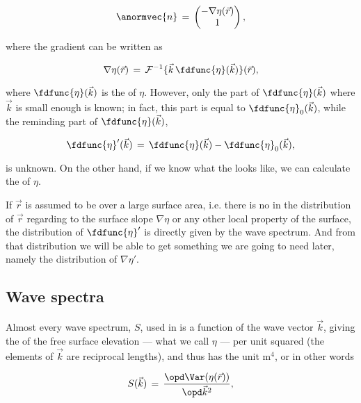 {\begin{equation}
\anormvec{n} \,=\, \left(\!\!\!\begin{array}{c}-\nabla\eta(\vec{r}) \\ 1\end{array}\!\!\!\right),
\end{equation}

where the gradient can be written as

\begin{equation}
\nabla\eta(\vec{r}) \,=\, \mathcal{F}^{-1}\{\vec{k}\,\fdfunc{\eta}(\vec{k})\}(\vec{r}),
\end{equation}

where $\fdfunc{\eta}(\vec{k})$ is the  of $\eta$. However, only the part of $\fdfunc{\eta}(\vec{k})$ where $\vec{k}$ is small enough is known; in fact, this part is equal to $\fdfunc{\eta}_0(\vec{k})$, while the reminding part of $\fdfunc{\eta}(\vec{k})$,

\begin{equation}
\fdfunc{\eta}'(\vec{k}) \,=\, \fdfunc{\eta}(\vec{k}) - \fdfunc{\eta}_0(\vec{k}),
\end{equation}

is unknown. On the other hand, if we know what the  looks like, we can calculate the  of $\eta$.

If $\vec{r}$ is assumed to be  over a large surface area, i.e. there is no \bias in the distribution of $\vec{r}$ regarding to the surface slope $\nabla\eta$ or any other local property of the surface, the distribution of $\fdfunc{\eta}'$ is directly given by the wave spectrum. And from that distribution we will be able to get something we are going to need later, namely the distribution of $\nabla\eta'$.

\subsection{Wave spectra}

Almost every wave spectrum, $S$, used in  is a function of the wave vector $\vec{k}$, giving the \variance of the free surface elevation --- what we call $\eta$ --- per unit  squared (the elements of $\vec{k}$ are reciprocal lengths), and thus has the unit $\text{m}^4$, or in other words

\begin{equation} \label{eq:wave_spectrum_definition}
S(\vec{k}) \,=\, \frac{\opd \Var(\eta(\vec{r}))}{\opd\vec{k}^2},
\end{equation}

}
